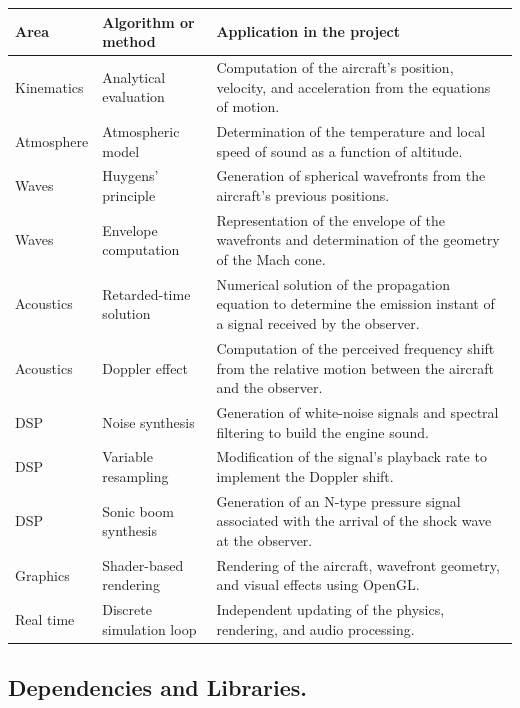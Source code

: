 \documentclass[10.5pt]{article}
\begin{document}
	\begin{table}[H]
		\centering
		\label{tab:algoritmos}
		\begin{tabular}{|l|p{4cm}|p{10cm}|}
			\hline
			\textbf{Area} & \textbf{Algorithm or method} & \textbf{Application in the project} \\
			\hline
			Kinematics &
			Analytical evaluation &
			Computation of the aircraft's position, velocity, and acceleration from the equations of motion. \\
			\hline
			Atmosphere &
			Atmospheric model &
			Determination of the temperature and local speed of sound as a function of altitude. \\
			\hline
			Waves &
			Huygens' principle &
			Generation of spherical wavefronts from the aircraft's previous positions. \\
			\hline
			Waves &
			Envelope computation &
			Representation of the envelope of the wavefronts and determination of the geometry of the Mach cone. \\
			\hline
			Acoustics &
			Retarded-time solution &
			Numerical solution of the propagation equation to determine the emission instant of a signal received by the observer. \\
			\hline
			Acoustics &
			Doppler effect &
			Computation of the perceived frequency shift from the relative motion between the aircraft and the observer. \\
			\hline
			DSP &
			Noise synthesis &
			Generation of white-noise signals and spectral filtering to build the engine sound. \\
			\hline
			DSP &
			Variable resampling &
			Modification of the signal's playback rate to implement the Doppler shift. \\
			\hline
			DSP &
			Sonic boom synthesis &
			Generation of an N-type pressure signal associated with the arrival of the shock wave at the observer. \\
			\hline
			Graphics &
			Shader-based rendering &
			Rendering of the aircraft, wavefront geometry, and visual effects using OpenGL. \\
			\hline
			Real time &
			Discrete simulation loop &
			Independent updating of the physics, rendering, and audio processing. \\
			\hline
		\end{tabular}
	\end{table}
	
	\subsection{Dependencies and Libraries.}
	
\end{document}

